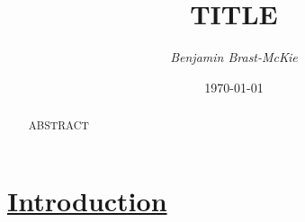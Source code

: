 \documentclass[11pt]{article} %
\newcommand{\hypsection}[1]{\section[#1]{\hyperlink{toc}{#1}}} %
\theoremstyle{theorem}
\theoremstyle{Lthm}
\theoremstyle{Pthm}
\begin{document}
\title{\sc TITLE} %
\author{\it Benjamin Brast-McKie} 
\date{\today}
\maketitle
\thispagestyle{empty}


\begin{abstract}
\noindent
ABSTRACT
\end{abstract}




\hypsection{Introduction}\label{Intro}
















\newpage
\begin{footnotesize} %
\singlespacing %
\setlength{\bibsep}{5pt} %
\thispagestyle{empty} %
\end{footnotesize} %
\end{document}
